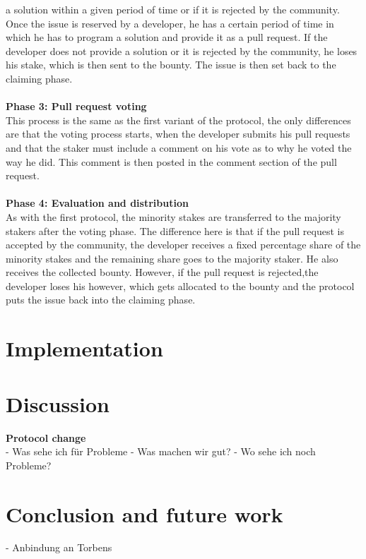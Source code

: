 \documentclass[sigconf]{acmart}
\begin{document}
a solution within a given period of time or if it is rejected by the community. Once the issue is reserved by a developer, 
he has a certain period of time in which he has to program a solution and provide it as a pull request. If the developer does not 
provide a solution or it is rejected by the community, he loses his stake, which is then sent to the bounty. The issue is then set back 
to the claiming phase. \\ \\
\textbf{Phase 3: Pull request voting} \\
This process is the same as the first variant of the protocol, the only differences are that the voting process starts, when 
the developer submits his pull requests and that the staker must include a comment on his 
vote as to why he voted the way he did. This comment is then posted in the comment section of the pull request. \\ \\
\textbf{Phase 4: Evaluation and distribution} \\
As with the first protocol, the minority stakes are transferred to the majority stakers after the voting phase. The difference 
here is that if the pull request is accepted by the community, the developer receives a fixed percentage share of the minority
stakes and the remaining share goes to the majority staker. He also receives the collected bounty. However, if the pull request 
is rejected,the developer loses his however, which gets allocated to the bounty and the protocol puts the issue back
 into the claiming phase.

\section{Implementation}


\section{Discussion}
\textbf{Protocol change}\\
- Was sehe ich für Probleme
- Was machen wir gut?
- Wo sehe ich noch Probleme?

\section{Conclusion and future work}
- Anbindung an Torbens 







\appendix
\end{document}
